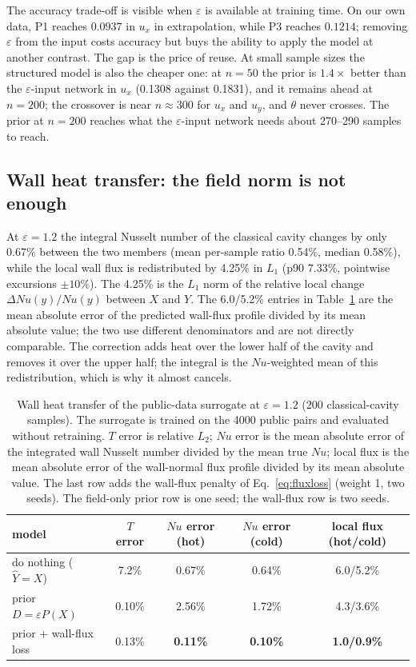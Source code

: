 \documentclass[preprint,11pt,a4paper,times,doubleblind]{elsarticle}
\begin{document}
The accuracy trade-off is visible when $\varepsilon$ is available at training time. On our own
\label{sec:blind}
data, P1 reaches $0.0937$ in $u_x$ in extrapolation, while P3 reaches $0.1214$; removing
$\varepsilon$ from the input costs accuracy but buys the ability to apply the model at another
contrast. The gap is the price of reuse. At small sample sizes the structured model is also
\label{sec:learning}
the cheaper one: at $n=50$ the prior is $1.4\times$ better than the $\varepsilon$-input network
in $u_x$ (0.1308 against 0.1831), and it remains ahead at $n=200$; the crossover is near
$n\approx300$ for $u_x$ and $u_y$, and $\theta$ never crosses. The prior at $n=200$ reaches
what the $\varepsilon$-input network needs about 270--290 samples to reach.

\subsection{Wall heat transfer: the field norm is not enough}
\label{sec:nu}
\label{sec:wall}

At $\varepsilon=1.2$ the integral Nusselt number of the classical cavity changes by only
0.67\% between the two members (mean per-sample ratio 0.54\%, median 0.58\%), while the local
wall flux is redistributed by 4.25\% in $L_1$ (p90 7.33\%, pointwise excursions $\pm10\%$).
The 4.25\% is the $L_1$ norm of the relative local change $\Delta Nu(y)/Nu(y)$ between $X$ and
$Y$. The 6.0/5.2\% entries in Table~\ref{tab:wall} are the mean absolute error of the
predicted wall-flux profile divided by its mean absolute value; the two use different
denominators and are not directly comparable.
The correction adds heat over the lower half of the cavity and removes it over the upper half;
the integral is the $Nu$-weighted mean of this redistribution, which is why it almost cancels.

\begin{table}[htbp]
\centering
\caption{Wall heat transfer of the public-data surrogate at $\varepsilon=1.2$ (200
classical-cavity samples). The surrogate is trained on the 4000 public pairs and evaluated
without retraining. $T$ error is relative $L_2$; $Nu$ error is the mean absolute error of the
integrated wall Nusselt number divided by the mean true $Nu$; local flux is the mean absolute
error of the wall-normal flux profile divided by its mean absolute value. The last row adds the
wall-flux penalty of Eq.~\eqref{eq:fluxloss} (weight 1, two seeds). The field-only prior row
is one seed; the wall-flux row is two seeds.}
\label{tab:wall}
\small
\setlength{\tabcolsep}{4pt}
\begin{tabular}{@{}lcccc@{}}
\toprule
model & $T$ error & $Nu$ error (hot) & $Nu$ error (cold) & local flux (hot/cold)\\
\midrule
do nothing ($\hat Y=X$) & 7.2\% & 0.67\% & 0.64\% & 6.0/5.2\%\\
prior $D=\varepsilon P(X)$ & 0.10\% & 2.56\% & 1.72\% & 4.3/3.6\%\\
prior + wall-flux loss & 0.13\% & \textbf{0.11\%} & \textbf{0.10\%} & \textbf{1.0/0.9\%}\\
\bottomrule
\end{tabular}
\end{table}
\end{document}
